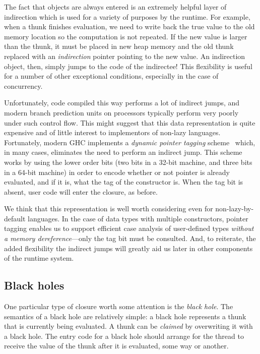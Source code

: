 
The fact that objects are always entered is an extremely helpful layer
of indirection which is used for a variety of purposes by the runtime.
For example, when a thunk finishes evaluation, we need to write back the
true value to the old memory location so the computation is not
repeated.  If the new value is larger than the thunk, it must be placed
in new heap memory and the old thunk replaced with an \emph{indirection}
pointer pointing to the new value.  An indirection object, then, simply
jumps to the code of the indirectee!  This flexibility is useful for a
number of other exceptional conditions, especially in the case of
concurrency.

Unfortunately, code compiled this way performs a lot of indirect jumps,
and modern branch prediction units on processors typically perform very
poorly under such control flow.  This might suggest that this data
representation is quite expensive and of little interest to implementors
of non-lazy languages.  Fortunately, modern GHC implements a
\emph{dynamic pointer tagging} scheme~\XXX{} which, in many cases,
eliminates the need to perform an indirect jump.  This scheme works by
using the lower order bits (two bits in a 32-bit machine, and three bits
in a 64-bit machine) in order to encode whether or not pointer is
already evaluated, and if it is, what the tag of the constructor is.
When the tag bit is absent, user code will enter the closure, as before.

We think that this representation is well worth considering even for
non-lazy-by-default languages.  In the case of data types with multiple
constructors, pointer tagging enables us to support efficient case
analysis of user-defined types \emph{without a memory
dereference}---only the tag bit must be consulted.  And, to reiterate,
the added flexibility the indirect jumps will greatly aid us later in
other components of the runtime system.


\subsection{Black holes} \label{sec:blackhole}

One particular type of closure worth some attention is the \emph{black
hole}.  The semantics of a black hole are relatively simple: a black
hole represents a thunk that is currently being evaluated.  A thunk
can be \emph{claimed} by overwriting it with a black hole. The entry
code for a black hole should arrange for the thread to receive the value
of the thunk after it is evaluated, some way or another.

